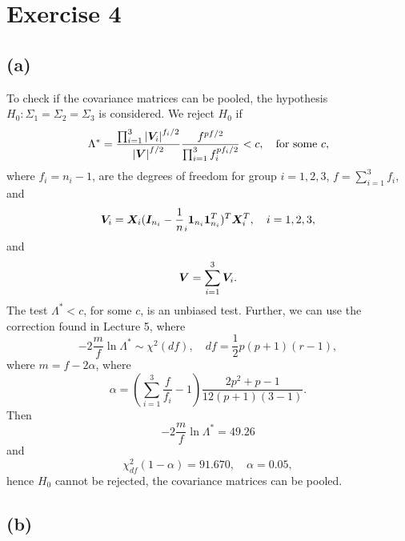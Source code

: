 \section*{Exercise 4}
\label{sec:exercise-4}

\subsection*{(a)}
\label{sec:a-3}

To check if the covariance matrices can be pooled, the hypothesis
$H_{0}: \Sigma_{1} =\Sigma_{2}  = \Sigma_{3}$ is considered. We
reject $H_{0}$ if
\begin{equation*}
  \Lambda^* = \frac{\prod_{i = 1}^{3} \left| \bm{V}_i \right|^{f_i/2}}{\left| \bm{V} \right|^{f/2}}
  \frac{f^{pf/2}}{\prod_{i = 1}^{3} f_i ^{pf_{i}/2}} < c,\quad
  \text{for some } c,
\end{equation*}
where $f_{i} = n_{i} - 1$, are the degrees of freedom for group $i = 1,
2, 3$, $f = \sum_{i=1}^{3}f_{i}$, and
\begin{equation*}
  \bm{V}_{i} = \bm{X}_{i} (\bm{I}_{n_{i}}  - \frac 1n_{i}\bm{1}_{n_{i}} \bm{1}_{n_{i}}^{T})^{T}
  \bm{X}_{i}^{T},\quad i = 1,2,3,
\end{equation*}
and
\begin{equation*}
  \bm{V} = \sum_{i=1}^{3} \bm{V}_{i}.
\end{equation*}
The test $\Lambda^{*} < c$, for some $c$, is an unbiased test.
Further, we can use the correction found in Lecture 5, where
\begin{equation*}
  -2 \frac{m}{f} \ln \Lambda^{*} \sim \chi^{2}(df), \quad df = \frac{1}{2}p(p+1)(r-1),
\end{equation*}
where $m = f- 2\alpha$, where
\begin{equation*}
  \alpha = 
  \left(
    \sum_{i = 1}^{3} \frac{f}{f_{i}} - 1
  \right)
  \frac{2p^{2} + p -1}{12(p+1)(3-1)}.
\end{equation*}
Then 
\begin{equation*}
   -2 \frac{m}{f} \ln \Lambda^{*} = 49.26
\end{equation*}
and
\begin{equation*}
  \chi_{df}^{2}(1-\alpha) = 91.670, \quad \alpha = 0.05,
\end{equation*}
hence $H_{0}$ cannot be rejected, the covariance matrices can be
pooled. 
\subsection*{(b)}
\label{sec:b-3}

